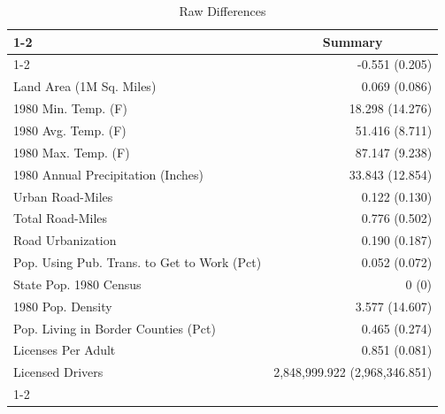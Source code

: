 \begin{table}[!h]
\caption{Raw Differences}
\centering
\begin{tabular}{ll}
\cline{1-2}
\multicolumn{1}{r}{} &
  \multicolumn{1}{c}{Summary} \\
\cline{1-2}
\multicolumn{1}{l}{Elasticity (Table 9)} &
  \multicolumn{1}{r}{-0.551 (0.205)} \\
\multicolumn{1}{l}{Land Area (1M Sq. Miles)} &
  \multicolumn{1}{r}{0.069 (0.086)} \\
\multicolumn{1}{l}{1980 Min. Temp. (F)} &
  \multicolumn{1}{r}{18.298 (14.276)} \\
\multicolumn{1}{l}{1980 Avg. Temp. (F)} &
  \multicolumn{1}{r}{51.416 (8.711)} \\
\multicolumn{1}{l}{1980 Max. Temp. (F)} &
  \multicolumn{1}{r}{87.147 (9.238)} \\
\multicolumn{1}{l}{1980 Annual Precipitation (Inches)} &
  \multicolumn{1}{r}{33.843 (12.854)} \\
\multicolumn{1}{l}{Urban Road-Miles} &
  \multicolumn{1}{r}{0.122 (0.130)} \\
\multicolumn{1}{l}{Total Road-Miles} &
  \multicolumn{1}{r}{0.776 (0.502)} \\
\multicolumn{1}{l}{Road Urbanization} &
  \multicolumn{1}{r}{0.190 (0.187)} \\
\multicolumn{1}{l}{Pop. Using Pub. Trans. to Get to Work (Pct)} &
  \multicolumn{1}{r}{0.052 (0.072)} \\
\multicolumn{1}{l}{State Pop. 1980 Census} &
  \multicolumn{1}{r}{0 (0)} \\
\multicolumn{1}{l}{1980 Pop. Density} &
  \multicolumn{1}{r}{3.577 (14.607)} \\
\multicolumn{1}{l}{Pop. Living in Border Counties (Pct)} &
  \multicolumn{1}{r}{0.465 (0.274)} \\
\multicolumn{1}{l}{Licenses Per Adult} &
  \multicolumn{1}{r}{0.851 (0.081)} \\
\multicolumn{1}{l}{Licensed Drivers} &
  \multicolumn{1}{r}{2,848,999.922 (2,968,346.851)} \\
\cline{1-2}
\end{tabular}
\end{table}

